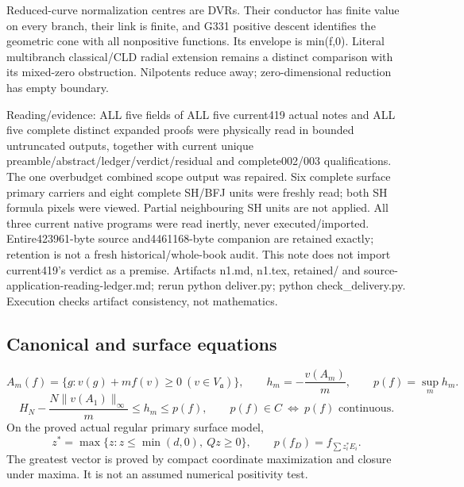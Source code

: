 Reduced-curve normalization centres are DVRs. Their conductor has finite value on every branch, their link is finite, and G331 positive descent identifies the geometric cone with all nonpositive functions. Its envelope is min(f,0). Literal multibranch classical/CLD radial extension remains a distinct comparison with its mixed-zero obstruction. Nilpotents reduce away; zero-dimensional reduction has empty boundary.

Reading/evidence: ALL five fields of ALL five current419 actual notes and ALL five complete distinct expanded proofs were physically read in bounded untruncated outputs, together with current unique preamble/abstract/ledger/verdict/residual and complete002/003 qualifications. The one overbudget combined scope output was repaired. Six complete surface primary carriers and eight complete SH/BFJ units were freshly read; both SH formula pixels were viewed. Partial neighbouring SH units are not applied. All three current native programs were read inertly, never executed/imported. Entire423961-byte source and4461168-byte companion are retained exactly; retention is not a fresh historical/whole-book audit. This note does not import current419's verdict as a premise. Artifacts n1.md, n1.tex, retained/ and source-application-reading-ledger.md; rerun python deliver.py; python check\_delivery.py. Execution checks artifact consistency, not mathematics.

\subsection*{Canonical and surface equations}
\[
 A_m(f)=\{g:v(g)+mf(v)\ge0\ (v\in V_{\mathfrak a})\},\qquad
 h_m=-\frac{v(A_m)}m,\qquad p(f)=\sup_m h_m .
\]
\[
 H_N-\frac{N\|v(A_1)\|_\infty}{m}\le h_m\le p(f),\qquad
 p(f)\in C\ \Longleftrightarrow\ p(f)\text{ continuous}.
\]
On the proved actual regular primary surface model,
\[
 z^*=\max\{z:z\le\min(d,0),\ Qz\ge0\},\qquad
 p(f_D)=f_{\sum z_i^*E_i}.
\]
The greatest vector is proved by compact coordinate maximization and
closure under maxima. It is not an assumed numerical positivity test.

